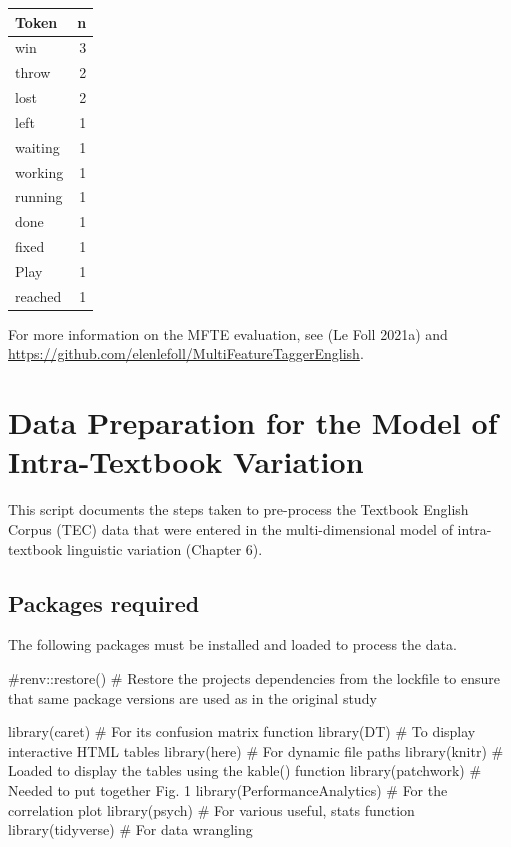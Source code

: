 \documentclass[
  letterpaper,
  DIV=11,
  numbers=noendperiod]{scrreprt}
\newenvironment{Shaded}{\begin{snugshade}}{\end{snugshade}}
\newcommand{\CommentTok}[1]{\textcolor[rgb]{0.37,0.37,0.37}{#1}}
\newcommand{\FunctionTok}[1]{\textcolor[rgb]{0.28,0.35,0.67}{#1}}
\newcommand{\NormalTok}[1]{\textcolor[rgb]{0.00,0.23,0.31}{#1}}
\begin{document}
\begin{longtable}[]{@{}lr@{}}
\toprule\noalign{}
Token & n \\
\midrule\noalign{}
\endhead
\bottomrule\noalign{}
\endlastfoot
win & 3 \\
throw & 2 \\
lost & 2 \\
left & 1 \\
waiting & 1 \\
working & 1 \\
running & 1 \\
done & 1 \\
fixed & 1 \\
Play & 1 \\
reached & 1 \\
\end{longtable}

For more information on the MFTE evaluation, see (Le Foll 2021a) and
\url{https://github.com/elenlefoll/MultiFeatureTaggerEnglish}.

\chapter{Data Preparation for the Model of Intra-Textbook
Variation}\label{data-preparation-for-the-model-of-intra-textbook-variation}

This script documents the steps taken to pre-process the Textbook
English Corpus (TEC) data that were entered in the multi-dimensional
model of intra-textbook linguistic variation (Chapter 6).

\section{Packages required}\label{packages-required-1}

The following packages must be installed and loaded to process the data.

\begin{Shaded}
\begin{Highlighting}[]
\CommentTok{\#renv::restore() \# Restore the project\textquotesingle{}s dependencies from the lockfile to ensure that same package versions are used as in the original study}

\FunctionTok{library}\NormalTok{(caret) }\CommentTok{\# For its confusion matrix function}
\FunctionTok{library}\NormalTok{(DT) }\CommentTok{\# To display interactive HTML tables}
\FunctionTok{library}\NormalTok{(here) }\CommentTok{\# For dynamic file paths}
\FunctionTok{library}\NormalTok{(knitr) }\CommentTok{\# Loaded to display the tables using the kable() function}
\FunctionTok{library}\NormalTok{(patchwork) }\CommentTok{\# Needed to put together Fig. 1}
\FunctionTok{library}\NormalTok{(PerformanceAnalytics) }\CommentTok{\# For the correlation plot}
\FunctionTok{library}\NormalTok{(psych) }\CommentTok{\# For various useful, stats function}
\FunctionTok{library}\NormalTok{(tidyverse) }\CommentTok{\# For data wrangling}
\end{Highlighting}
\end{Shaded}
\end{document}
